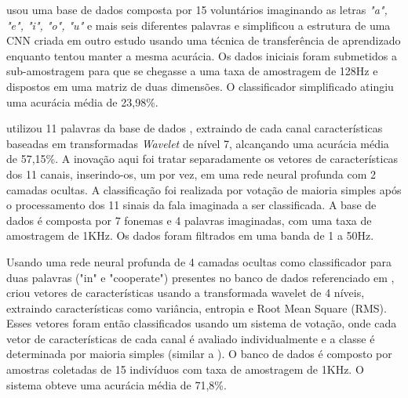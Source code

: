 			\par \cite{tamm2020classification} usou uma base de dados composta por 15 voluntários imaginando as letras \textit{"a", "e", "i", "o", "u"} e mais seis diferentes palavras \cite{10.1117/12.2255697} e simplificou a estrutura de uma CNN criada em outro estudo usando uma técnica de transferência de aprendizado enquanto tentou manter a mesma acurácia. Os dados iniciais foram submetidos a sub-amostragem para que se chegasse a uma taxa de amostragem de 128Hz e dispostos em uma matriz de duas dimensões. O classificador simplificado atingiu uma acurácia média de 23,98\%.
			
			\par \cite{Panachakel_2019} utilizou 11 palavras da base de dados \cite{7178118}, extraindo de cada canal características baseadas em transformadas \textit{Wavelet} de nível 7, alcançando uma acurácia média de 57,15\%. A inovação aqui foi tratar separadamente os vetores de características dos 11 canais, inserindo-os, um por vez, em uma rede neural profunda com 2 camadas ocultas. A classificação foi realizada por votação de maioria simples após o processamento dos 11 sinais da fala imaginada a ser classificada. A base de dados é composta por 7 fonemas e 4 palavras imaginadas, com uma taxa de amostragem de 1KHz. Os dados foram filtrados em uma banda de 1 a 50Hz.
			
			\par Usando uma rede neural profunda de 4 camadas ocultas como classificador para duas palavras ("in" e "cooperate") presentes no banco de dados referenciado em \cite{dasalla2009single}, \cite{panachakel2020novel} criou vetores de características usando a transformada wavelet de 4 níveis, extraindo características como variância, entropia e Root Mean Square (RMS). Esses vetores foram então classificados usando um sistema de votação, onde cada vetor de características de cada canal é avaliado individualmente e a classe é determinada por maioria simples (similar a \cite{Panachakel_2019}). O banco de dados é composto por amostras coletadas de 15 indivíduos com taxa de amostragem de 1KHz. O sistema obteve uma acurácia média de 71,8\%.
			
